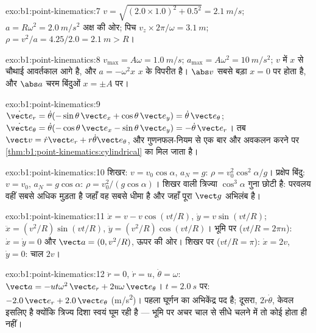 \begin{solution}{exo:b1:point-kinematics:7}
$v = \sqrt{(2.0 \times 1.0)^2 + 0.5^2} = \qty{2.1}{m/s}$; $a = R\omega^2 =
\qty{2.0}{m/s^2}$ अक्ष की ओर; पिच $v_z \times 2\pi/\omega =
\qty{3.1}{m}$; $\rho = v^2/a = 4.25/2.0 = \qty{2.1}{m} > R$।
\end{solution}

\begin{solution}{exo:b1:point-kinematics:8}
$v_{\max} = A\omega = \qty{1.0}{m/s}$; $a_{\max} = A\omega^2 = \qty{10}{m/s^2}$;
$v$  में $x$ से चौथाई आवर्तकाल आगे है, और $a = -\omega^2x$ $x$ के विपरीत है।
$\abs v$ सबसे बड़ा $x = 0$ पर होता है, और $\abs a$ चरम बिंदुओं $x = \pm A$ पर।
\end{solution}

\begin{solution}{exo:b1:point-kinematics:9}
$\dot{\vect e}_r = \dot\theta(-\sin\theta\,\vect e_x + \cos\theta\,\vect e_y)
= \dot\theta\,\vect e_\theta$; $\dot{\vect e}_\theta = \dot\theta(-\cos\theta\,
\vect e_x - \sin\theta\,\vect e_y) = -\dot\theta\,\vect e_r$। तब
$\vect v = \dot r\vect e_r + r\dot\theta\vect e_\theta$, और गुणनफल-नियम से एक
बार और अवकलन करने पर \cref{thm:b1:point-kinematics:cylindrical} का 
मिल जाता है।
\end{solution}

\begin{solution}{exo:b1:point-kinematics:10}
शिखर: $v = v_0\cos\alpha$, $a_N = g$: $\rho = v_0^2\cos^2\alpha/g$।
प्रक्षेप बिंदु: $v = v_0$, $a_N = g\cos\alpha$: $\rho = v_0^2/(g\cos\alpha)$।
शिखर वाली त्रिज्या $\cos^3\alpha$ गुना छोटी है: परवलय वहीं सबसे अधिक मुड़ता
है जहाँ वह सबसे धीमा है और जहाँ पूरा $\vect g$ अभिलंब है।
\end{solution}

\begin{solution}{exo:b1:point-kinematics:11}
$\dot x = v - v\cos(vt/R)$, $\dot y = v\sin(vt/R)$; $\ddot x = (v^2/R)
\sin(vt/R)$, $\ddot y = (v^2/R)\cos(vt/R)$। भूमि पर ($vt/R = 2\pi n$):
$\dot x = \dot y = 0$ और $\vect a = (0, v^2/R)$, ऊपर की ओर। शिखर पर
($vt/R = \pi$): $\dot x = 2v$, $\dot y = 0$: चाल $2v$।
\end{solution}

\begin{solution}{exo:b1:point-kinematics:12}
$\ddot r = 0$, $\dot r = u$, $\dot\theta = \omega$: $\vect a = -ut\omega^2\,
\vect e_r + 2u\omega\,\vect e_\theta$। $t = \qty{2.0}{s}$ पर: $-2.0\,\vect e_r
+ 2.0\,\vect e_\theta$ (\unit{m/s^2})। पहला घूर्णन का अभिकेंद्र पद है;
दूसरा, $2\dot r\dot\theta$, केवल इसलिए है क्योंकि त्रिज्य दिशा स्वयं घूम
रही है --- भूमि पर अचर चाल से सीधे चलने में तो कोई  होता ही नहीं।
\end{solution}


